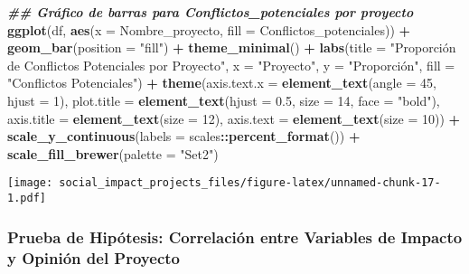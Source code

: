 \documentclass[
]{article}
\newenvironment{Shaded}{\begin{snugshade}}{\end{snugshade}}
\newcommand{\AttributeTok}[1]{\textcolor[rgb]{0.13,0.29,0.53}{#1}}
\newcommand{\DecValTok}[1]{\textcolor[rgb]{0.00,0.00,0.81}{#1}}
\newcommand{\DocumentationTok}[1]{\textcolor[rgb]{0.56,0.35,0.01}{\textbf{\textit{#1}}}}
\newcommand{\FloatTok}[1]{\textcolor[rgb]{0.00,0.00,0.81}{#1}}
\newcommand{\FunctionTok}[1]{\textcolor[rgb]{0.13,0.29,0.53}{\textbf{#1}}}
\newcommand{\NormalTok}[1]{#1}
\newcommand{\SpecialCharTok}[1]{\textcolor[rgb]{0.81,0.36,0.00}{\textbf{#1}}}
\newcommand{\StringTok}[1]{\textcolor[rgb]{0.31,0.60,0.02}{#1}}
\begin{document}
\begin{Shaded}
\begin{Highlighting}[]
\DocumentationTok{\#\# Gráfico de barras para Conflictos\_potenciales por proyecto}
\FunctionTok{ggplot}\NormalTok{(df, }\FunctionTok{aes}\NormalTok{(}\AttributeTok{x =}\NormalTok{ Nombre\_proyecto, }\AttributeTok{fill =}\NormalTok{ Conflictos\_potenciales)) }\SpecialCharTok{+}
  \FunctionTok{geom\_bar}\NormalTok{(}\AttributeTok{position =} \StringTok{"fill"}\NormalTok{) }\SpecialCharTok{+}
  \FunctionTok{theme\_minimal}\NormalTok{() }\SpecialCharTok{+}
  \FunctionTok{labs}\NormalTok{(}\AttributeTok{title =} \StringTok{"Proporción de Conflictos Potenciales por Proyecto"}\NormalTok{,}
       \AttributeTok{x =} \StringTok{"Proyecto"}\NormalTok{, }\AttributeTok{y =} \StringTok{"Proporción"}\NormalTok{, }\AttributeTok{fill =} \StringTok{"Conflictos Potenciales"}\NormalTok{) }\SpecialCharTok{+}
  \FunctionTok{theme}\NormalTok{(}\AttributeTok{axis.text.x =} \FunctionTok{element\_text}\NormalTok{(}\AttributeTok{angle =} \DecValTok{45}\NormalTok{, }\AttributeTok{hjust =} \DecValTok{1}\NormalTok{), }
        \AttributeTok{plot.title =} \FunctionTok{element\_text}\NormalTok{(}\AttributeTok{hjust =} \FloatTok{0.5}\NormalTok{, }\AttributeTok{size =} \DecValTok{14}\NormalTok{, }\AttributeTok{face =} \StringTok{"bold"}\NormalTok{),}
        \AttributeTok{axis.title =} \FunctionTok{element\_text}\NormalTok{(}\AttributeTok{size =} \DecValTok{12}\NormalTok{),}
        \AttributeTok{axis.text =} \FunctionTok{element\_text}\NormalTok{(}\AttributeTok{size =} \DecValTok{10}\NormalTok{)) }\SpecialCharTok{+}
  \FunctionTok{scale\_y\_continuous}\NormalTok{(}\AttributeTok{labels =}\NormalTok{ scales}\SpecialCharTok{::}\FunctionTok{percent\_format}\NormalTok{()) }\SpecialCharTok{+}
  \FunctionTok{scale\_fill\_brewer}\NormalTok{(}\AttributeTok{palette =} \StringTok{"Set2"}\NormalTok{)}
\end{Highlighting}
\end{Shaded}

\texttt{[image: social\_impact\_projects\_files/figure-latex/unnamed-chunk-17-1.pdf]}

\subsubsection{\texorpdfstring{\textbf{Prueba de Hipótesis:} Correlación
entre Variables de Impacto y Opinión del
Proyecto}{Prueba de Hipótesis: Correlación entre Variables de Impacto y Opinión del Proyecto}}\label{prueba-de-hipuxf3tesis-correlaciuxf3n-entre-variables-de-impacto-y-opiniuxf3n-del-proyecto}
\end{document}
